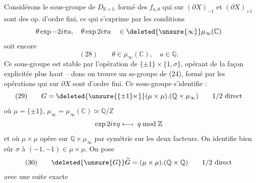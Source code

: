 Considérons le sous-groupe de  $D_{\mathbb R\times\mathbb U}$ formé des $f_{a,\theta}$ qui  sur $(\partial X)_{-1}$ et $(\partial X)_{+1}$ sont des  op. d'ordre fini, ce qui s'exprime par les conditions
\[
\theta\exp-2i\pi a,\quad\theta\exp2i\pi a\quad\in\deleted{\unsure{\infty}}\mu_\infty(\mathbb C)
\]
soit encore
\[
(28)\qquad\theta\in\mu_\infty(\mathbb C),\quad a\in\mathbb Q.
\]
Ce sous-groupe est stable par l'opération de $\{\pm1\}\times\{1,\sigma\}$, opérant de la façon explicitée plus haut -- donc on trouve un ss-groupe de (24), formé  par les opérations  qui sur $\partial X$ sont d'ordre fini. Ce sous-groupe  s'identifie :
\[
(29)\qquad G=\deleted{\unsure{\{\pm1\}\ltimes}}(\mu\times\mu).(\mathbb Q\times\mu_\infty)\qquad1/2\text{ direct}
\]
où $\mu=\{\pm1\}$, $\mu_\infty=\mu_\infty(\mathbb C)\simeq\mathbb Q/\mathbb Z$
\[
\exp2i\pi q\longleftarrow\!\shortmid\ q\bmod\mathbb Z
\]
et où $\mu\times\mu$ opère sur $\mathbb Q\times\mu_\infty$ par symétrie sur les deux facteurs. On identifie bien sûr $\sigma$ à $(-1,-1)\in\mu\times\mu$. On pose
\[
(30)\qquad\deleted{\unsure{G}}\widetilde G=(\mu\times\mu).(\mathbb Q\times\mathbb Q)\qquad1/2\text{ direct}
\]
avec une suite exacte


